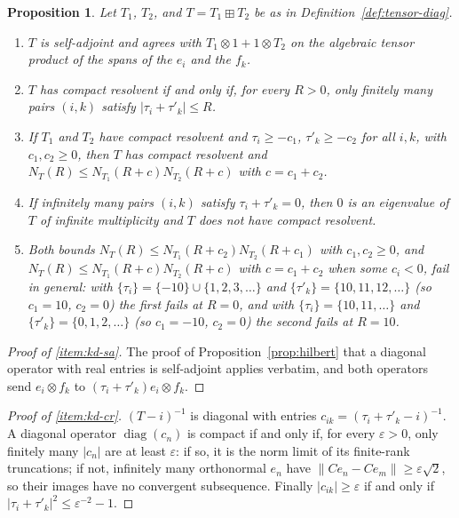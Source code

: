 \documentclass[11pt]{amsart}
\theoremstyle{plain}
\newtheorem{proposition}[theorem]{Proposition}
\theoremstyle{definition}
\theoremstyle{remark}
\numberwithin{equation}{section}
\DeclareMathOperator{\diag}{diag}
\begin{document}
\begin{proposition}\label{prop:kun-diag}
Let $T_1$, $T_2$, and $T=T_1\boxplus T_2$ be as in
Definition~\ref{def:tensor-diag}.
\begin{enumerate}[label=(\roman*)]
\item\label{item:kd-sa} $T$ is self-adjoint and agrees with
  $T_1\otimes1+1\otimes T_2$ on the algebraic tensor product of the
  spans of the $e_i$ and the $f_k$.
\item\label{item:kd-cr} $T$ has compact resolvent if and only if, for
  every $R>0$, only finitely many pairs $(i,k)$ satisfy
  $|\tau_i+\tau'_k|\le R$.
\item\label{item:kd-semi} If $T_1$ and $T_2$ have compact resolvent and
  $\tau_i\ge-c_1$, $\tau'_k\ge-c_2$ for all $i,k$, with $c_1,c_2\ge0$,
  then $T$ has compact resolvent and
  $N_T(R)\le N_{T_1}(R+c)N_{T_2}(R+c)$ with $c=c_1+c_2$.
\item\label{item:kd-sym} If infinitely many pairs $(i,k)$ satisfy
  $\tau_i+\tau'_k=0$, then $0$ is an eigenvalue of $T$ of infinite
  multiplicity and $T$ does not have compact resolvent.
\item\label{item:kd-sharp} Both bounds $N_T(R)\le N_{T_1}(R+c_2)
  N_{T_2}(R+c_1)$ with $c_1,c_2\ge0$, and $N_T(R)\le N_{T_1}(R+c)
  N_{T_2}(R+c)$ with $c=c_1+c_2$ when some $c_i<0$, fail in general:
  with $\{\tau_i\}=\{-10\}\cup\{1,2,3,\dots\}$ and
  $\{\tau'_k\}=\{10,11,12,\dots\}$ (so $c_1=10$, $c_2=0$) the first
  fails at $R=0$, and with $\{\tau_i\}=\{10,11,\dots\}$ and
  $\{\tau'_k\}=\{0,1,2,\dots\}$ (so $c_1=-10$, $c_2=0$) the second
  fails at $R=10$.
\end{enumerate}
\end{proposition}

\begin{proof}[Proof of \ref{item:kd-sa}]
The proof of Proposition~\ref{prop:hilbert} that a diagonal operator
with real entries is self-adjoint applies verbatim, and both operators
send $e_i\otimes f_k$ to $(\tau_i+\tau'_k)e_i\otimes f_k$.
\end{proof}

\begin{proof}[Proof of \ref{item:kd-cr}]
$(T-i)^{-1}$ is diagonal with entries $c_{ik}=(\tau_i+\tau'_k-i)^{-1}$.
A diagonal operator $\diag(c_n)$ is compact if and only if, for every
$\varepsilon>0$, only finitely many $|c_n|$ are at least $\varepsilon$:
if so, it is the norm limit of its finite-rank truncations; if not,
infinitely many orthonormal $e_n$ have $\|Ce_n-Ce_m\|\ge\varepsilon
\sqrt2$, so their images have no convergent subsequence. Finally
$|c_{ik}|\ge\varepsilon$ if and only if
$|\tau_i+\tau'_k|^2\le\varepsilon^{-2}-1$.
\end{proof}
\end{document}
